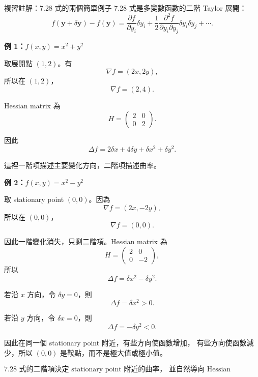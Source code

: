 \documentclass[11pt,a4paper,twoside]{article}
\newcommand{\StudyNote}[2]{\begin{studyNote}{#1}#2\end{studyNote}}
\begin{document}
\StudyNote{複習註解：7.28 式的兩個簡單例子}{
    7.28 式是多變數函數的二階 Taylor 展開：
    \[
        f(\mathbf y+\delta\mathbf y)-f(\mathbf y)
        =
        \frac{\partial f}{\partial y_i}\delta y_i
        +
        \frac12
        \frac{\partial^2 f}{\partial y_i\partial y_j}
        \delta y_i\delta y_j+\cdots .
    \]

    \textbf{例 1：$f(x,y)=x^2+y^2$}

    取展開點 $(1,2)$。有
    \[
        \nabla f=(2x,2y),
    \]
    所以在 $(1,2)$，
    \[
        \nabla f=(2,4).
    \]

    Hessian matrix 為
    \[
        H=
        \begin{pmatrix}
            2 & 0 \\
            0 & 2
        \end{pmatrix}.
    \]

    因此
    \[
        \Delta f
        =
        2\delta x+4\delta y
        +
        \delta x^2+\delta y^2.
    \]

    這裡一階項描述主要變化方向，二階項描述曲率。

    \medskip

    \textbf{例 2：$f(x,y)=x^2-y^2$}

    取 stationary point $(0,0)$。因為
    \[
        \nabla f=(2x,-2y),
    \]
    所以在 $(0,0)$，
    \[
        \nabla f=(0,0).
    \]

    因此一階變化消失，只剩二階項。Hessian matrix 為
    \[
        H=
        \begin{pmatrix}
            2 & 0  \\
            0 & -2
        \end{pmatrix},
    \]
    所以
    \[
        \Delta f
        =
        \delta x^2-\delta y^2.
    \]

    若沿 $x$ 方向，令 $\delta y=0$，則
    \[
        \Delta f=\delta x^2>0.
    \]

    若沿 $y$ 方向，令 $\delta x=0$，則
    \[
        \Delta f=-\delta y^2<0.
    \]

    因此在同一個 stationary point 附近，有些方向使函數增加，
    有些方向使函數減少，所以 $(0,0)$ 是鞍點，而不是極大值或極小值。

    \[
        \boxed{
            \text{7.28 式的二階項決定 stationary point 附近的曲率，
                並自然導向 Hessian matrix。}
        }
    \]
}
\end{document}
